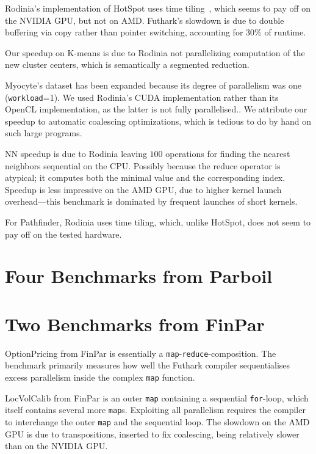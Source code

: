 Rodinia's implementation of HotSpot uses time
tiling~\cite{HexaTiling}, which seems to pay off on the NVIDIA GPU,
but not on AMD. Futhark's slowdown is due to double buffering via copy
rather than pointer switching, accounting for $30\%$ of runtime.

Our speedup on K-means is due to Rodinia not parallelizing computation
of the new cluster centers, which is semantically a segmented
reduction.

Myocyte's dataset has been expanded because its degree of parallelism
was one (\texttt{workload}=1).  We used Rodinia's CUDA implementation
rather than its OpenCL implementation, as the latter is not fully
parallelised..  We attribute our speedup to automatic coalescing
optimizations, which is tedious to do by hand on such large programs.

NN speedup is due to Rodinia leaving $100$  operations for
finding the nearest neighbors sequential on the CPU. Possibly because
the reduce operator is atypical; it computes both the minimal value
and the corresponding index.  Speedup is less impressive on the AMD
GPU, due to higher kernel launch overhead---this benchmark is
dominated by frequent launches of short kernels.

For Pathfinder, Rodinia uses time tiling, which, unlike HotSpot, does
not seem to pay off on the tested hardware.

\section{Four Benchmarks from Parboil}

\section{Two Benchmarks from FinPar}
\label{sec:finpar}

OptionPricing from FinPar is essentially a
\lstinline{map}-\lstinline{reduce}-composition.  The benchmark primarily
measures how well the Futhark compiler sequentialises excess
parallelism inside the complex \lstinline{map} function.

LocVolCalib from FinPar is an outer \lstinline{map} containing a
sequential \lstinline{for}-loop, which itself contains several more
\lstinline{map}s.  Exploiting all parallelism requires the compiler to
interchange the outer \lstinline{map} and the sequential loop.  The
slowdown on the AMD GPU is due to transpositions, inserted to fix
coalescing, being relatively slower than on the NVIDIA GPU.


